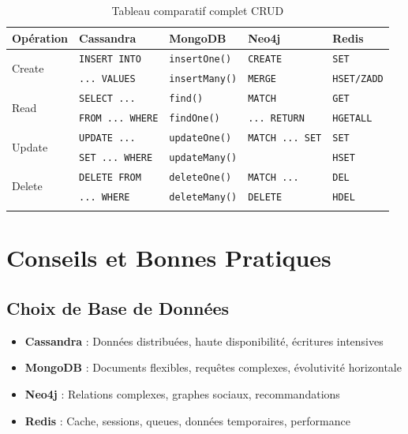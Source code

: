 \documentclass[11pt,a4paper]{article}
\begin{document}
\begin{longtable}{|p{2cm}|p{3.5cm}|p{3.5cm}|p{3.5cm}|p{3.5cm}|}
\hline
\textbf{Opération} & \textbf{Cassandra} & \textbf{MongoDB} & \textbf{Neo4j} & \textbf{Redis} \\
\hline
\endhead
\multirow{2}{*}{Create} & \texttt{INSERT INTO} & \texttt{insertOne()} & \texttt{CREATE} & \texttt{SET} \\
& \texttt{... VALUES} & \texttt{insertMany()} & \texttt{MERGE} & \texttt{HSET/ZADD} \\
\hline
\multirow{2}{*}{Read} & \texttt{SELECT ...} & \texttt{find()} & \texttt{MATCH} & \texttt{GET} \\
& \texttt{FROM ... WHERE} & \texttt{findOne()} & \texttt{... RETURN} & \texttt{HGETALL} \\
\hline
\multirow{2}{*}{Update} & \texttt{UPDATE ...} & \texttt{updateOne()} & \texttt{MATCH ... SET} & \texttt{SET} \\
& \texttt{SET ... WHERE} & \texttt{updateMany()} & & \texttt{HSET} \\
\hline
\multirow{2}{*}{Delete} & \texttt{DELETE FROM} & \texttt{deleteOne()} & \texttt{MATCH ...} & \texttt{DEL} \\
& \texttt{... WHERE} & \texttt{deleteMany()} & \texttt{DELETE} & \texttt{HDEL} \\
\hline
\caption{Tableau comparatif complet CRUD}
\end{longtable}

\newpage

\section{Conseils et Bonnes Pratiques}

\subsection{Choix de Base de Données}

\begin{itemize}
    \item \textbf{Cassandra} : Données distribuées, haute disponibilité, écritures intensives
    \item \textbf{MongoDB} : Documents flexibles, requêtes complexes, évolutivité horizontale
    \item \textbf{Neo4j} : Relations complexes, graphes sociaux, recommandations
    \item \textbf{Redis} : Cache, sessions, queues, données temporaires, performance
\end{itemize}
\end{document}
